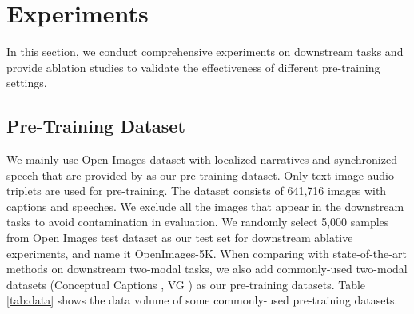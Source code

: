 \documentclass[10pt,twocolumn,letterpaper]{article}
\begin{document}
\begin{table}[!t]
\begin{center}
\caption{Statistics of some common pre-training datasets.}
\label{tab:data}
\end{center}
\end{table}

\section{Experiments}
In this section, we conduct comprehensive experiments on downstream tasks and provide ablation studies to validate the effectiveness of different pre-training settings. 

\subsection{Pre-Training Dataset}
We mainly use Open Images \cite{kuznetsova2020open} dataset with localized narratives and synchronized speech that are provided by \cite{pont2020connecting} as our pre-training dataset. Only text-image-audio triplets are used for pre-training. The dataset consists of 641,716 images with captions and speeches. We exclude all the images that appear in the downstream tasks to avoid contamination in evaluation. We randomly select 5,000 samples from Open Images test dataset as our test set for downstream ablative experiments, and name it OpenImages-5K. When comparing with state-of-the-art methods on downstream two-modal tasks, we also add commonly-used two-modal datasets (\eg Conceptual Captions \cite{sharma2018conceptual}, VG \cite{krishna2017visual}) as our pre-training datasets. Table \ref{tab:data} shows the data volume of some commonly-used pre-training datasets. 
\end{document}
